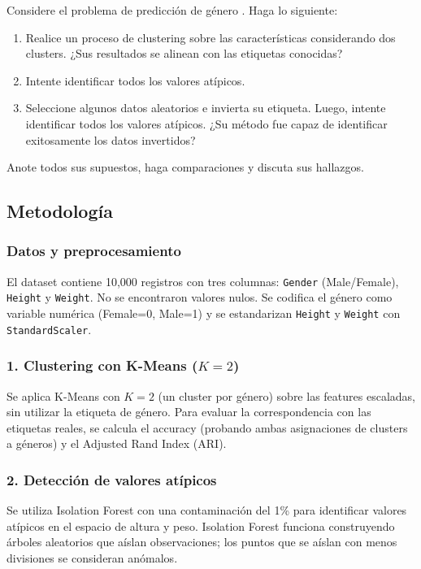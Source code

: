 \documentclass{article}
\begin{document}
Considere el problema de predicción de género \cite{kaggleWeightHeightOutlier}. Haga lo siguiente:
\begin{enumerate}
    \item Realice un proceso de clustering sobre las características considerando dos clusters. ¿Sus resultados se alinean con las etiquetas conocidas?
    \item Intente identificar todos los valores atípicos.
    \item Seleccione algunos datos aleatorios e invierta su etiqueta. Luego, intente identificar todos los valores atípicos. ¿Su método fue capaz de identificar exitosamente los datos invertidos?
\end{enumerate}
Anote todos sus supuestos, haga comparaciones y discuta sus hallazgos.

\subsection{Metodología}

\subsubsection{Datos y preprocesamiento}

El dataset contiene 10,000 registros con tres columnas: \texttt{Gender} (Male/Female), \texttt{Height} y \texttt{Weight}. No se encontraron valores nulos. Se codifica el género como variable numérica (Female=0, Male=1) y se estandarizan \texttt{Height} y \texttt{Weight} con \texttt{StandardScaler}.

\subsubsection{1. Clustering con K-Means ($K=2$)}

Se aplica K-Means con $K=2$ (un cluster por género) sobre las features escaladas, sin utilizar la etiqueta de género. Para evaluar la correspondencia con las etiquetas reales, se calcula el accuracy (probando ambas asignaciones de clusters a géneros) y el Adjusted Rand Index (ARI).

\subsubsection{2. Detección de valores atípicos}

Se utiliza Isolation Forest con una contaminación del 1\% para identificar valores atípicos en el espacio de altura y peso. Isolation Forest funciona construyendo árboles aleatorios que aíslan observaciones; los puntos que se aíslan con menos divisiones se consideran anómalos.
\end{document}
